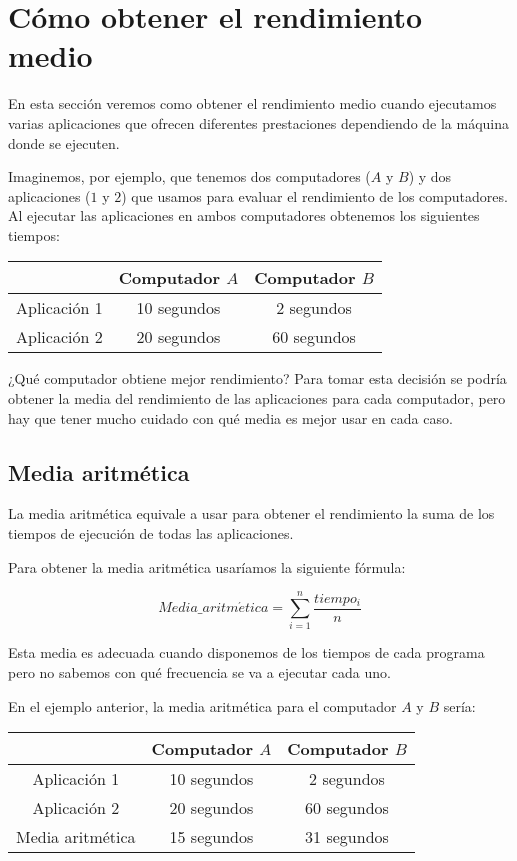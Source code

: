 \documentclass[12pt,onecolumn]{memoir}
\begin{document}
\section{Cómo obtener el rendimiento medio}

En esta sección veremos como obtener el rendimiento medio cuando
ejecutamos varias aplicaciones que ofrecen diferentes prestaciones dependiendo de la máquina donde se
ejecuten.

Imaginemos, por ejemplo, que tenemos dos computadores ($A$ y $B$) y
dos aplicaciones ($1$ y $2$) que usamos
para evaluar el rendimiento de los computadores. Al ejecutar las
aplicaciones en ambos computadores obtenemos los siguientes tiempos:

\begin{center}
\begin{tabular}{ccc}
\hline
  & Computador $A$ & Computador $B$ \\ 
\hline
 Aplicación 1 & 10 segundos & 2 segundos \\  
 Aplicación 2 & 20 segundos & 60 segundos \\
 \hline
\end{tabular}
\end{center}

¿Qué computador obtiene mejor rendimiento?
Para tomar esta decisión se podría obtener la media del rendimiento de las aplicaciones
para cada computador, pero hay que tener mucho cuidado con qué media
es mejor usar en cada caso.

\subsection{Media aritmética}

La media aritmética equivale a usar para obtener el rendimiento la
suma de los tiempos de ejecución de todas las aplicaciones.

Para obtener la media aritmética usaríamos la siguiente fórmula:

\[ Media\_aritm\acute{e}tica = \sum_{i=1}^{n} \frac{tiempo_i }{n} \]

Esta media es adecuada cuando disponemos de los tiempos de cada
programa pero no sabemos con qué frecuencia se va a ejecutar cada uno.

En el ejemplo anterior, la media aritmética para el computador $A$ y
$B$ sería:

\begin{center}
\begin{tabular}{ccc}
\hline
  & Computador $A$ & Computador $B$ \\ 
\hline
 Aplicación 1 & 10 segundos & 2 segundos \\  
 Aplicación 2 & 20 segundos & 60 segundos \\
 \hline
 Media aritmética & 15 segundos & 31 segundos \\
 \hline
\end{tabular}
\end{center}
\end{document}

